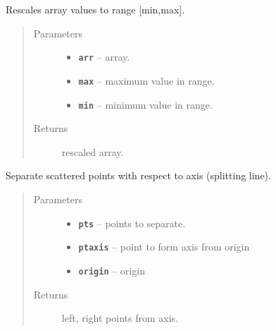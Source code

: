 \documentclass[letterpaper,10pt,english]{sphinxmanual}
\begin{document}
\begin{fulllineitems}
\label{RRtoolbox.lib.arrayops:RRtoolbox.lib.arrayops.basic.rescale}
Rescales array values to range {[}min,max{]}.
\begin{quote}\begin{description}
\item[{Parameters}] \leavevmode\begin{itemize}
\item {} 
\textbf{\texttt{arr}} -- array.

\item {} 
\textbf{\texttt{max}} -- maximum value in range.

\item {} 
\textbf{\texttt{min}} -- minimum value in range.

\end{itemize}

\item[{Returns}] \leavevmode
rescaled array.

\end{description}\end{quote}

\end{fulllineitems}


\begin{fulllineitems}
\label{RRtoolbox.lib.arrayops:RRtoolbox.lib.arrayops.basic.separePointsByAxis}
Separate scattered points with respect to axis (splitting line).
\begin{quote}\begin{description}
\item[{Parameters}] \leavevmode\begin{itemize}
\item {} 
\textbf{\texttt{pts}} -- points to separate.

\item {} 
\textbf{\texttt{ptaxis}} -- point to form axis from origin

\item {} 
\textbf{\texttt{origin}} -- origin

\end{itemize}

\item[{Returns}] \leavevmode
left, right points from axis.

\end{description}\end{quote}

\end{fulllineitems}
\end{document}
